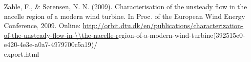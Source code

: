 Zahle, F., & Sørensen, N. N. (2009). Characterisation of the unsteady flow in the nacelle region of a modern wind turbine. In Proc. of the European Wind Energy Conference, 2009.
Online:  
\small{\url{http://orbit.dtu.dk/en/publications/characterization-of-the-unsteady-flow-in-\\the-nacelle-r}egion-of-a-modern-wind-turbine(392515e0-e420-4e3e-a0a7-4979700c5a19)/\\export.html}

\setlength{\parindent}{0in}

